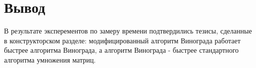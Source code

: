 \pagebreak
\section{Вывод}
В результате эксперементов по замеру времени подтвердились тезисы, сделанные в конструкторском разделе: модифицированный алгоритм Винограда работает быстрее алгоритма Винограда, а алгоритм Винограда - быстрее стандартного алгоритма умножения матриц.

